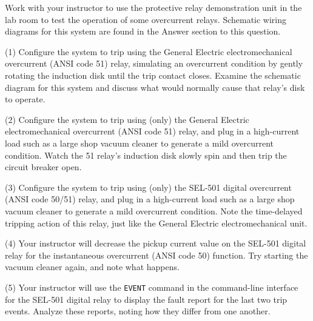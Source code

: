 

Work with your instructor to use the protective relay demonstration unit in the lab room to test the operation of some overcurrent relays.  Schematic wiring diagrams for this system are found in the Answer section to this question.

\vskip 10pt

(1) Configure the system to trip using the General Electric electromechanical overcurrent (ANSI code 51) relay, simulating an overcurrent condition by gently rotating the induction disk until the trip contact closes.  Examine the schematic diagram for this system and discuss what would normally cause that relay's disk to operate.

\vskip 10pt

(2) Configure the system to trip using (only) the General Electric electromechanical overcurrent (ANSI code 51) relay, and plug in a high-current load such as a large shop vacuum cleaner to generate a mild overcurrent condition.  Watch the 51 relay's induction disk slowly spin and then trip the circuit breaker open.

\vskip 10pt

(3) Configure the system to trip using (only) the SEL-501 digital overcurrent (ANSI code 50/51) relay, and plug in a high-current load such as a large shop vacuum cleaner to generate a mild overcurrent condition.  Note the time-delayed tripping action of this relay, just like the General Electric electromechanical unit.

\vskip 10pt

(4) Your instructor will decrease the pickup current value on the SEL-501 digital relay for the instantaneous overcurrent (ANSI code 50) function.  Try starting the vacuum cleaner again, and note what happens.

\vskip 10pt

(5) Your instructor will use the {\tt EVENT} command in the command-line interface for the SEL-501 digital relay to display the fault report for the last two trip events.  Analyze these reports, noting how they differ from one another.

\vskip 10pt







